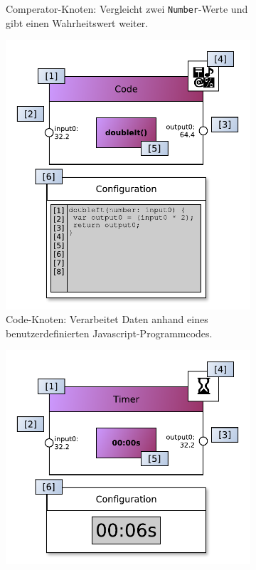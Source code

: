 \begin{figure}[H]
\begin{subfigure}{.5\textwidth}
  \caption{Comperator-Knoten: Vergleicht zwei \texttt{Number}-Werte und gibt einen Wahrheitswert weiter.}
  \label{fig:funccompare}
\end{subfigure}

\begin{subfigure}{.5\textwidth}
  \centering
  \includegraphics[width=1\linewidth]{bilder/Anhang/instancecodefunctionnode.pdf}
  \caption{Code-Knoten: Verarbeitet Daten anhand eines benutzerdefinierten Javascript-Programmcodes.}
  \label{fig:actorspecific}
\end{subfigure}%
\begin{subfigure}{.5\textwidth}
  \centering
  \includegraphics[width=1\linewidth]{bilder/Anhang/instancetimerfunctionnode.pdf}

\end{subfigure}
\end{figure}
